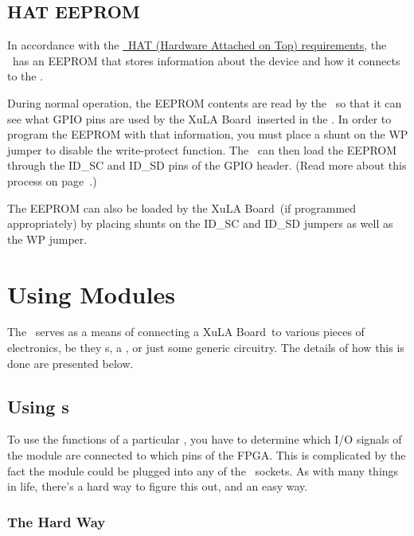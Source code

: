 \documentclass[letterpaper,11pt,oneside]{memoir}
\newcommand{\xula}{XuLA Board}
\renewcommand{\fixedpic}[1]{}
\begin{document}
\pagebreak %

\section{HAT EEPROM}

In accordance with the 
\href{https://github.com/raspberrypi/hats}{\rpi\ HAT (Hardware Attached on Top) requirements},
the \product\ has an EEPROM that stores information about the device and how it
connects to the \rpi.

\fixedpic{\texttt{[image: eeprom.png]}}

During normal operation, the EEPROM contents are read by the \rpi\ so that it can see
what GPIO pins are used by the \xula\ inserted in the \product.
In order to program the EEPROM with that information, you must place a shunt on
the WP jumper to disable the write-protect function.
The \rpi\ can then load the EEPROM through the ID\_SC and ID\_SD pins of the 
GPIO header.
(Read more about this process on page~\pageref{sec:GPIOConfig}.)

The EEPROM can also be loaded by the \xula\ (if programmed appropriately) by placing shunts
on the ID\_SC and ID\_SD jumpers as well as the WP jumper.


\chapter{Using Modules}

The \product\ serves as a means of connecting a \xula\ to various pieces of
electronics, be they \digpmod s, a \rpi, or just some generic circuitry.
The details of how this is done are presented below.

\section{Using \digpmod s}

To use the functions of a particular \digpmod, you have to determine which
I/O signals of the module are connected to which pins of the FPGA.
This is complicated by the fact the module could be plugged into any of the
\digpmod\ sockets.
As with many things in life, there's a hard way to figure this out, and an easy way.

\subsection{The Hard Way}
\end{document}
